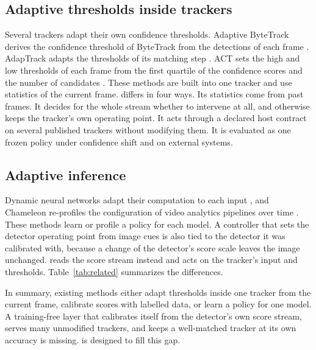 \subsection{Adaptive thresholds inside trackers}
Several trackers adapt their own confidence thresholds. Adaptive ByteTrack
derives the confidence threshold of ByteTrack from the detections of each
frame \cite{ma2023adaptivebytetrack}. AdapTrack adapts the thresholds of its
matching step \cite{shim2024adaptrack}. ACT sets the high and low thresholds
of each frame from the first quartile of the confidence scores and the number
of candidates \cite{act2026adaptive}. These methods are built into one tracker
and use statistics of the current frame. \scl{} differs in
four ways. Its statistics come from past frames. It decides for the whole
stream whether to intervene at all, and otherwise keeps the tracker's own
operating point. It acts through a declared host contract on several
published trackers without modifying them. It is evaluated as one frozen
policy under confidence shift and on external systems.

\subsection{Adaptive inference}
Dynamic neural networks adapt their computation to each input
\cite{han2022dynamic}, and Chameleon re-profiles the configuration of video
analytics pipelines over time \cite{jiang2018chameleon}. These methods learn or
profile a policy for each model. A controller that sets the detector operating
point from image cues is also tied to the detector it was calibrated with,
because a change of the detector's score scale leaves the image unchanged.
\scl{} reads the score stream instead and acts on the
tracker's input and thresholds. Table~\ref{tab:related} summarizes the
differences.

In summary, existing methods either adapt thresholds inside one tracker from
the current frame, calibrate scores with labelled data, or learn a policy for
one model. A training-free layer that calibrates itself from the detector's
own score stream, serves many unmodified trackers, and keeps a well-matched
tracker at its own accuracy is missing. \scl{} is designed to fill this gap.

